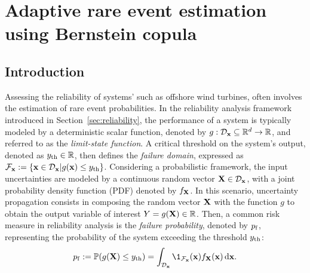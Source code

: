 \cleardoublepage
\chapter{Adaptive rare event estimation using Bernstein copula}
\label{chpt:6}
\hfill
\localtableofcontents
\newpage

\section{Introduction}

Assessing the reliability of systems' such as offshore wind turbines, often involves the estimation of rare event probabilities. 
In the reliability analysis framework introduced in Section~\ref{sec:reliability}, the performance of a system is typically modeled by a deterministic scalar function, denoted by $g: \mathcal{D}_{\bf x} \subseteq \mathbb{R}^d \rightarrow \mathbb{R}$, and referred to as the \textit{limit-state function}. 
A critical threshold on the system's output, denoted as $y_\mathrm{th} \in \mathbb{R}$, then defines the \textit{failure domain}, expressed as $\mathcal{F}_{{\bf x}} := \{{\bf x} \in \mathcal{D}_{\bf x} | g({\bf x}) \leq y_\mathrm{th}\}$. 
Considering a probabilistic framework, the input uncertainties are modeled by a continuous random vector ${\bf X} \in \mathcal{D}_{\bf x}$, with a joint probability density function (PDF) denoted by $f_{\bf X}$. 
In this scenario, uncertainty propagation consists in composing the random vector ${\bf X}$ with the function $g$ to obtain the output variable of interest $Y = g({\bf X}) \in \mathbb{R}$. 
Then, a common risk measure in reliability analysis is the \textit{failure probability}, denoted by $p_\mathrm{f}$, representing the probability of the system exceeding the threshold $y_\mathrm{th}$:
\begin{equation}
    \label{eq:failure_proba_c6}
    \pf := \P(g(\bX) \leq \yth)
        = \int_{\iD_\bx} \1_{\iF_\bx}(\bx) f_\bX(\bx) \, \dd\bx.
\end{equation}

